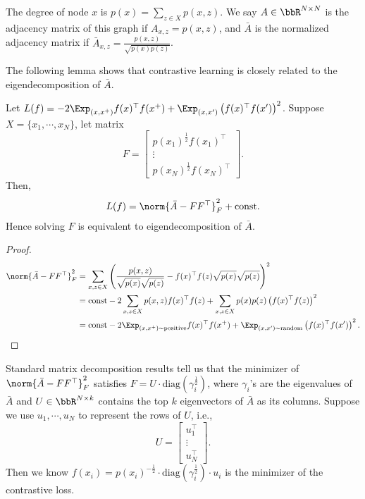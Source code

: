 The degree of node $x$ is $p(x) = \sum_{z\in X} p(x, z)$.  We say $A\in\bbR^{N\times N}$ is the adjacency matrix of this graph if $A_{x, z} = p(x, z)$, and $\bar{A}$ is the normalized adjacency matrix if $\bar{A}_{x, z} = \frac{p(x, z)}{\sqrt{p(x)p(z)}}$. 

The following lemma shows that contrastive learning is closely related to the eigendecomposition of $\bar{A}$. 
\begin{lemma}
	Let $L(f) = -2\Exp_{(x, x^+) } f(x)^\top f(x^+) + \Exp_{(x, x') } \left(f(x)^\top f(x')\right)^2$.  Suppose $X=\{x_1, \cdots, x_N\}$, let matrix 
	\begin{equation}
	    F = \begin{bmatrix}  p(x_1)^{\frac{1}{2}} f(x_1)^\top  \\ \vdots \\  p(x_N)^{\frac{1}{2}} f(x_N)^\top \end{bmatrix}.
	\end{equation}
	Then,
	\begin{align}
		L(f) = \norm{\bar{A}-FF^\top}_F^2 +\text{const}.
	\end{align}
	Hence solving $F$ is equivalent to eigendecomposition of $\bar{A}$. 
\end{lemma}
\begin{proof}
\begin{align}
	\norm{\bar{A} - FF^\top}_F^2 &= \sum_{x, z\in X} \left(\frac{p(x, z)}{\sqrt{p(x)}\sqrt{p(z)}} - f(x)^\top f(z) \sqrt{p(x)}\sqrt{p(z)}\right)^2\\
	&= \text{const} -2 \sum_{x, z\in X} p(x, z) f(x)^\top f(z) + \sum_{x, z\in X}p(x)p(z)\left(f(x)^\top f(z)\right)^2\\
	&= \text{const} -2\Exp_{(x, x^+) \sim\text{positive}} f(x)^\top f(x^+) + \Exp_{(x, x') \sim\text{random}}  \left(f(x)^\top f(x')\right)^2.
\end{align}
\end{proof}

Standard matrix decomposition results tell us that the minimizer of $\norm{\bar{A}-FF^\top}_F^2 $ satisfies $F = U \cdot \text{diag}(\gamma_i^{\frac{1}{2}})$, where $\gamma_i$'s are the eigenvalues of $\bar{A}$ and $U\in\bbR^{N\times k}$ contains the top $k$ eigenvectors of $\bar{A}$ as its columns. Suppose we use $u_1, \cdots, u_N$ to represent the rows of $U$, i.e., 
	\begin{equation}
	U = \begin{bmatrix}  u_1^\top  \\ \vdots \\  u_N^\top \end{bmatrix}.
\end{equation}
Then we know $f(x_i)= p(x_i)^{-\frac{1}{2}} \cdot \text{diag}(\gamma_i^{\frac{1}{2}}) \cdot u_i$ is the minimizer of the contrastive loss. 

